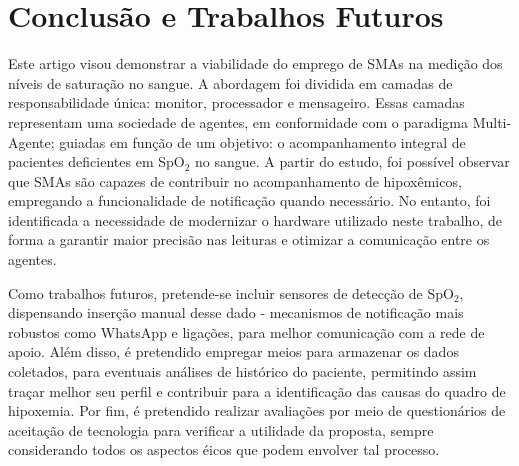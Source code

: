 \section{Conclusão e Trabalhos Futuros}
Este artigo visou demonstrar a viabilidade do emprego de SMAs na medição dos níveis de saturação no sangue. A abordagem foi dividida em camadas de responsabilidade única: monitor, processador e mensageiro. Essas camadas representam uma sociedade de agentes, em conformidade com o paradigma Multi-Agente; guiadas em função de um objetivo: o acompanhamento integral de pacientes deficientes em SpO$_2$ no sangue. A partir do estudo, foi possível observar que SMAs são capazes de contribuir no acompanhamento de hipoxêmicos, empregando a funcionalidade de notificação quando necessário. No entanto, foi identificada a necessidade de modernizar o hardware utilizado neste trabalho, de forma a garantir maior precisão nas leituras e otimizar a comunicação entre os agentes.

Como trabalhos futuros, pretende-se incluir sensores de detecção de SpO$_2$, dispensando inserção manual desse dado - mecanismos de notificação mais robustos como WhatsApp e ligações, para melhor comunicação com a rede de apoio. Além disso, é pretendido empregar meios para armazenar os dados coletados, para eventuais análises de histórico do paciente, permitindo assim traçar melhor seu perfil e contribuir para a identificação das causas do quadro de hipoxemia. Por fim, é pretendido realizar avaliações por meio de questionários de aceitação de tecnologia para verificar a utilidade da proposta, sempre considerando todos os aspectos éicos que podem envolver tal processo.